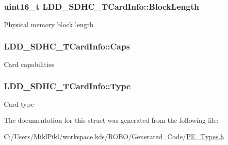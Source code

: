 \subsubsection[{Block\+Length}]{\setlength{\rightskip}{0pt plus 5cm}uint16\+\_\+t L\+D\+D\+\_\+\+S\+D\+H\+C\+\_\+\+T\+Card\+Info\+::\+Block\+Length}\label{struct_l_d_d___s_d_h_c___t_card_info_a46cbdea4ece83eeaa17410e9763cc3a9}
Physical memory block length \hypertarget{struct_l_d_d___s_d_h_c___t_card_info_a591c22d1aa49944325b35c63d2bf8199}{}
\subsubsection[{Caps}]{ L\+D\+D\+\_\+\+S\+D\+H\+C\+\_\+\+T\+Card\+Info\+::\+Caps}\label{struct_l_d_d___s_d_h_c___t_card_info_a591c22d1aa49944325b35c63d2bf8199}
Card capabilities \hypertarget{struct_l_d_d___s_d_h_c___t_card_info_ab2b86f6fe821778459edd351d08eb4bd}{}
\subsubsection[{Type}]{ L\+D\+D\+\_\+\+S\+D\+H\+C\+\_\+\+T\+Card\+Info\+::\+Type}\label{struct_l_d_d___s_d_h_c___t_card_info_ab2b86f6fe821778459edd351d08eb4bd}
Card type 

The documentation for this struct was generated from the following file\+:\begin{DoxyCompactItemize}
\item 
C\+:/\+Users/\+Mikl\+Pikl/workspace.\+kds/\+R\+O\+B\+O/\+Generated\+\_\+\+Code/\hyperlink{_p_e___types_8h}{P\+E\+\_\+\+Types.\+h}\end{DoxyCompactItemize}
